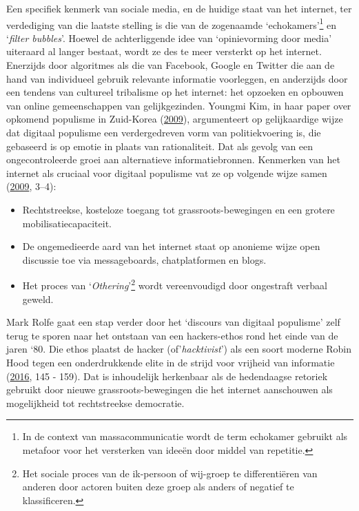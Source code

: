 \documentclass[10.5pt,dutch,]{article}
\providecommand{\tightlist}{%
  \setlength{\itemsep}{0pt}\setlength{\parskip}{0pt}}
\begin{document}
Een specifiek kenmerk van sociale media, en de huidige staat van het
internet, ter verdediging van die laatste stelling is die van de
zogenaamde `echokamers'\footnote{In de context van massacommunicatie
  wordt de term echokamer gebruikt als metafoor voor het versterken van
  ideeën door middel van repetitie.} en `\emph{filter bubbles}'. Hoewel
de achterliggende idee van `opinievorming door media' uiteraard al
langer bestaat, wordt ze des te meer versterkt op het internet.
Enerzijds door algoritmes als die van Facebook, Google en Twitter die
aan de hand van individueel gebruik relevante informatie voorleggen, en
anderzijds door een tendens van cultureel tribalisme op het internet:
het opzoeken en opbouwen van online gemeenschappen van gelijkgezinden.
Youngmi Kim, in haar paper over opkomend populisme in Zuid-Korea
(\protect\hyperlink{ref-kimux5fdigitalux5f2009}{2009}), argumenteert op
gelijkaardige wijze dat digitaal populisme een verdergedreven vorm van
politiekvoering is, die gebaseerd is op emotie in plaats van
rationaliteit. Dat als gevolg van een ongecontroleerde groei aan
alternatieve informatiebronnen. Kenmerken van het internet als cruciaal
voor digitaal populisme vat ze op volgende wijze samen
(\protect\hyperlink{ref-kimux5fdigitalux5f2009}{2009}, 3--4):

\begin{itemize}
\tightlist
\item
  Rechtstreekse, kosteloze toegang tot grassroots-bewegingen en een
  grotere mobilisatiecapaciteit.
\item
  De ongemedieerde aard van het internet staat op anonieme wijze open
  discussie toe via messageboards, chatplatformen en blogs.
\item
  Het proces van `\emph{Othering}'\footnote{Het sociale proces van de
    ik-persoon of wij-groep te differentiëren van anderen door actoren
    buiten deze groep als anders of negatief te klassificeren.} wordt
  vereenvoudigd door ongestraft verbaal geweld.
\end{itemize}

Mark Rolfe gaat een stap verder door het `discours van digitaal
populisme' zelf terug te sporen naar het ontstaan van een hackers-ethos
rond het einde van de jaren `80. Die ethos plaatst de hacker
(of'\emph{hacktivist}') als een soort moderne Robin Hood tegen een
onderdrukkende elite in de strijd voor vrijheid van informatie
(\protect\hyperlink{ref-rolfeux5freinventionux5f2016}{2016}, 145 - 159).
Dat is inhoudelijk herkenbaar als de hedendaagse retoriek gebruikt door
nieuwe grassroots-bewegingen die het internet aanschouwen als
mogelijkheid tot rechtstreekse democratie.
\end{document}

